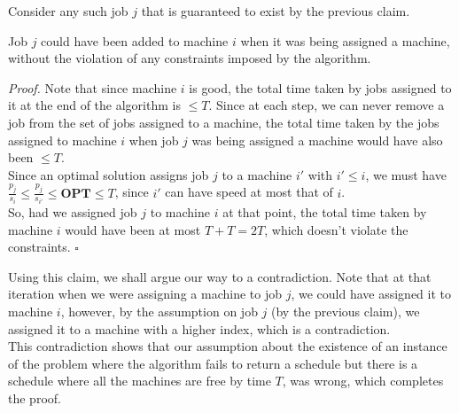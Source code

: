 \documentclass[a4paper]{article}
\newenvironment{proof}{\begin{breakbox}\textit{Proof.}}{\hfill$\square$\end{breakbox}}
\newcommand{\nl}{\vspace{0.2cm}\\}
\newcommand{\OPT}{\mathbf{OPT}}
\begin{document}
Consider any such job $j$ that is guaranteed to exist by the previous claim.\nl
\begin{claim}
    Job $j$ could have been added to machine $i$ when it was being assigned a machine, without the violation of any constraints imposed by the algorithm.
\end{claim}
\begin{proof}
    Note that since machine $i$ is good, the total time taken by jobs assigned to it at the end of the algorithm is $\le T$. Since at each step, we can never remove a job from the set of jobs assigned
    to a machine, the total time taken by the jobs assigned to machine $i$ when job $j$ was being assigned a machine would have also been $\le T$.\nl
    Since an optimal solution assigns job $j$ to a machine $i'$ with $i' \le i$, we must have $\frac{p_j}{s_i} \le \frac{p_j}{s_{i'}} \le \OPT \le T$, since $i'$ can have speed at most that of
    $i$.\nl
    So, had we assigned job $j$ to machine $i$ at that point, the total time taken by machine $i$ would have been at most $T + T = 2T$, which doesn't violate the constraints.
\end{proof}

Using this claim, we shall argue our way to a contradiction. Note that at that iteration when we were assigning a machine to job $j$, we could have assigned it to machine $i$, however, by
the assumption on job $j$ (by the previous claim), we assigned it to a machine with a higher index, which is a contradiction.\nl

This contradiction shows that our assumption about the existence of an instance of the problem where the algorithm fails to return a schedule but there is a schedule where all the machines are free
by time $T$, was wrong, which completes the proof.
\end{document}
